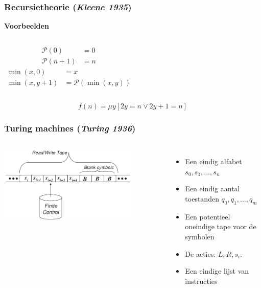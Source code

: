 \documentclass{beamer}
\begin{document}
\begin{frame}
    \frametitle{Recursietheorie (\emph{Kleene 1935})}
    \textbf{Voorbeelden}
    \begin{columns}
            \begin{align*}
                \mathcal{P} (0) & = 0 \\
                \mathcal{P} (n + 1) & = n
            \end{align*}
            \begin{align*}
                \min (x,0) & = x \\
                \min (x, y+1) & = \mathcal{P}(\min (x,y))
            \end{align*}
        \end{columns}
        \vspace{1cm}
        $$f(n) = \mu y [2y= n \vee 2y+1 = n]$$
\end{frame}

\begin{frame}
    \frametitle{Turing machines (\emph{Turing 1936})}
    \begin{columns}
            \includegraphics[width=0.8\textwidth]{tm.png}
            \begin{itemize}
                \item<2-> Een eindig alfabet $s_0, s_1, \ldots, s_n$
                \item<3-> Een eindig aantal toestanden $q_0, q_1, \ldots, q_m$
                \item<4-> Een potentieel oneindige tape voor de symbolen
                \item<5-> De acties: $L, R, s_i$.
                \item<6-> Een eindige lijst van instructies
            \end{itemize}
    \end{columns}
\end{frame}
\end{document}
